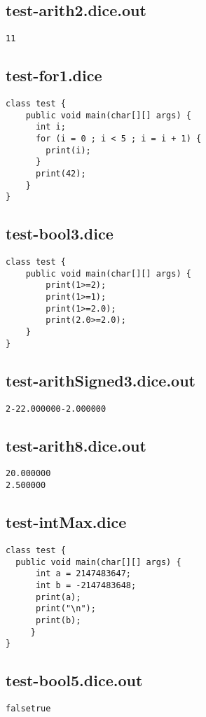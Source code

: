\subsection{test-arith2.dice.out}
\begin{verbatim}
11
\end{verbatim}
\pagebreak
\subsection{test-for1.dice}
\begin{verbatim}
class test {
	public void main(char[][] args) {
	  int i;
	  for (i = 0 ; i < 5 ; i = i + 1) {
	    print(i);
	  }
	  print(42);
	}
}
\end{verbatim}
\pagebreak
\subsection{test-bool3.dice}
\begin{verbatim}
class test {
	public void main(char[][] args) {
		print(1>=2);
		print(1>=1);
		print(1>=2.0);
		print(2.0>=2.0);
	}
}
\end{verbatim}
\pagebreak
\subsection{test-arithSigned3.dice.out}
\begin{verbatim}
2-22.000000-2.000000
\end{verbatim}
\pagebreak
\subsection{test-arith8.dice.out}
\begin{verbatim}
20.000000
2.500000
\end{verbatim}
\pagebreak
\subsection{test-intMax.dice}
\begin{verbatim}
class test {
  public void main(char[][] args) {
      int a = 2147483647;
      int b = -2147483648;
      print(a);
      print("\n");
      print(b);
     }
}
\end{verbatim}
\pagebreak
\subsection{test-bool5.dice.out}
\begin{verbatim}
falsetrue
\end{verbatim}
\pagebreak
